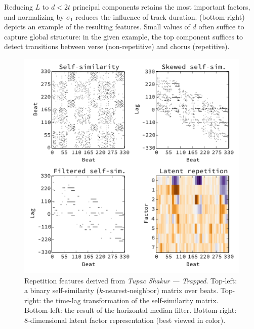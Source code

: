 \documentclass{article}
\begin{document}
Reducing $L$ to $d < 2t$ principal components retains the most important factors, and normalizing by $\sigma_1$ reduces 
the influence of track duration. 
 (bottom-right) depicts an example of the resulting features.  
Small values of $d$ often suffice to capture global structure: in the given
example, the top component suffices to detect transitions between verse 
(non-repetitive) and chorus (repetitive).

\begin{figure}
\centering%
\includegraphics[width=\columnwidth]{figs/rep}
\vspace{-2\baselineskip}
\caption{Repetition features derived from \emph{Tupac Shakur --- Trapped}. 
Top-left: a binary self-similarity ($k$-nearest-neighbor) matrix over beats.
Top-right: the time-lag transformation of the self-similarity matrix.
Bottom-left: the result of the horizontal median filter.
Bottom-right: 8-dimensional latent factor representation (best viewed in color).}
\label{fig:rep}
\end{figure}
\end{document}
